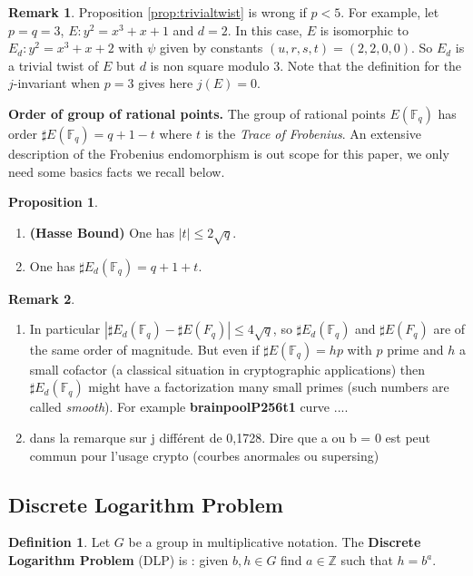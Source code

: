 \documentclass[10pt]{article}
\theoremstyle{definition}
\newtheorem{definition}{Definition}
\newtheorem{proposition}{Proposition}
\newtheorem{remark}{Remark}
\newcommand{\F}{\mathbb{F}}
\newcommand{\Z}{\mathbb{Z}}
\begin{document}
\noindent \begin{remark}
Proposition \ref{prop:trivialtwist} is wrong if $p < 5$.
For example, let $p=q=3$, $E : y^2 = x^3 + x + 1$ and $d = 2$.
In this case, $E$ is isomorphic to $E_d : y^2 = x^3+x+2$  with $\psi$ given by constants $(u,r,s,t) = (2,2,0,0)$.
So $E_d$ is a trivial twist of $E$ but $d$ is non square modulo $3$.
Note that the definition for the $j$-invariant when $p=3$ gives here $j(E) = 0$.
\end{remark}

\noindent \textbf{Order of group of rational points.} The group of rational points $E(\F_q)$ has order $\sharp E(\F_q) = q + 1 -t$ where $t$ is the \textsl{Trace of Frobenius}.
An extensive description of the Frobenius endomorphism is out scope for this paper, we only need some basics facts we recall below.

\begin{proposition}
\begin{enumerate}
\item \textbf{(Hasse Bound)} One has $|t|  \leq 2 \sqrt{q}$.
\item One has $\sharp{} E_d(\F_q) = q+1+t$.
\end{enumerate}
\end{proposition}

\begin{remark}
\begin{enumerate}
\item In particular $|\sharp{} E_d(\F_q) - \sharp{}E(F_q)| \leq 4\sqrt{q}$, so $\sharp{} E_d(\F_q)$ and $\sharp{} E(F_q)$ are of the same order of magnitude.
But even if $\sharp{} E(\F_q) = hp$ with $p$ prime and $h$ a small cofactor (a classical situation in cryptographic applications) then $\sharp{}E_d(\F_q)$ might have a factorization many small primes (such numbers are called \textsl{smooth}).
For example \textbf{brainpoolP256t1} curve .... 
\item dans la remarque sur j différent de 0,1728. Dire que a ou b = 0 est peut commun pour l'usage crypto (courbes anormales ou supersing)
\end{enumerate}
\end{remark}

\subsection{Discrete Logarithm Problem}

\begin{definition}
Let $G$ be a group in multiplicative notation.
The \textbf{Discrete Logarithm Problem} (DLP) is : given $b,h \in G$ find $a \in \Z$ such that $h = b^a$.
\end{definition}
\end{document}
